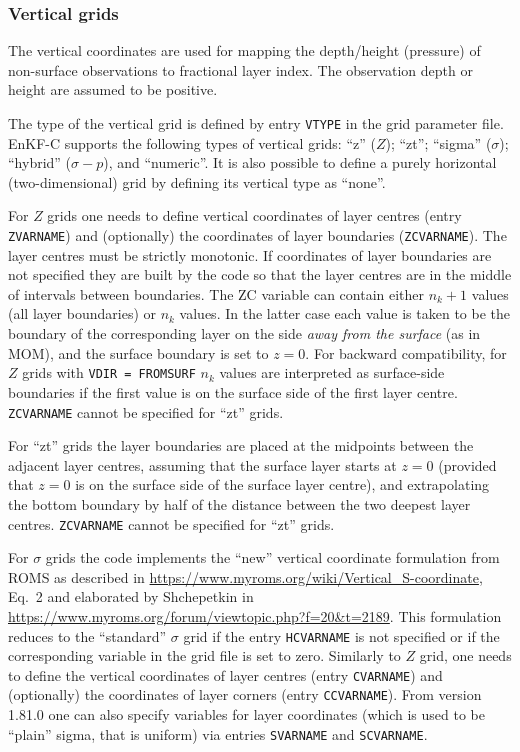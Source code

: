 \documentclass[11pt]{report}
\begin{document}
\subsubsection{Vertical grids}

The vertical coordinates are used for mapping the depth/height (pressure) of non-surface observations to fractional layer index.
The observation depth or height are assumed to be positive.

The type of the vertical grid is defined by entry \verb|VTYPE| in the grid parameter file.
EnKF-C supports the following types of vertical grids: ``z'' ($Z$); ``zt''; ``sigma'' ($\sigma$); ``hybrid'' ($\sigma-p$), and ``numeric''.
It is also possible to define a purely horizontal (two-dimensional) grid by defining its vertical type as ``none''.

For $Z$ grids one needs to define vertical coordinates of layer centres (entry \verb|ZVARNAME|) and (optionally) the coordinates of layer boundaries (\verb|ZCVARNAME|).
The layer centres must be strictly monotonic.
If coordinates of layer boundaries are not specified they are built by the code so that the layer centres are in the middle of intervals between boundaries.
The ZC variable can contain either $n_k + 1$ values (all layer boundaries) or $n_k$ values.
In the latter case each value is taken to be the boundary of the corresponding layer on the side \emph{away from the surface} (as in MOM), and the surface boundary is set to $z = 0$.
For backward compatibility, for $Z$ grids with \verb|VDIR = FROMSURF| $n_k$ values are interpreted as surface-side boundaries if the first value is on the surface side of the first layer centre.
\verb|ZCVARNAME| cannot be specified for ``zt'' grids.

For ``zt'' grids the layer boundaries are placed at the midpoints between the adjacent layer centres, assuming that the surface layer starts at $z = 0$ (provided that $z = 0$ is on the surface side of the surface layer centre), and extrapolating the bottom boundary by half of the distance between the two deepest layer centres.
\verb|ZCVARNAME| cannot be specified for ``zt'' grids.

For $\sigma$ grids the code implements the ``new'' vertical coordinate formulation from ROMS as described in \url{https://www.myroms.org/wiki/Vertical_S-coordinate}, Eq.~2 and elaborated by Shchepetkin in \url{https://www.myroms.org/forum/viewtopic.php?f=20&t=2189}.
This formulation reduces to the ``standard'' $\sigma$ grid if the entry \verb|HCVARNAME| is not specified or if the corresponding variable in the grid file is set to zero.
Similarly to $Z$ grid, one needs to define the vertical coordinates of layer centres (entry \verb|CVARNAME|) and (optionally) the coordinates of layer corners (entry \verb|CCVARNAME|).
From version 1.81.0 one can also specify variables for layer coordinates (which is used to be ``plain'' sigma, that is uniform) via entries \verb|SVARNAME| and \verb|SCVARNAME|.
\end{document}
